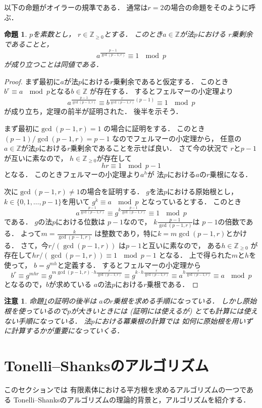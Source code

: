 \documentclass[leqno]{jsarticle}
\newtheorem{prop}[thm]{命題}
\newtheorem*{rmk}{注意}
\newcommand{\zz}{\mathbb{Z}}
\begin{document}
以下の命題がオイラーの規準である．
通常は$r=2$の場合の命題をそのように呼ぶ．
\begin{prop}\label{prop:Euler}
$p$を素数とし，
$r\in \zz_{\ge 0}$とする．
このとき$a\in \zz$が法$p$における
$r$乗剰余であることと，
\[
a^{\frac{p-1}{\gcd(p-1, r)}}\equiv 1\ \mod p
\]
が成り立つことは同値である．
\end{prop}
\begin{proof}
まず最初に$a$が法$p$における$r$乗剰余であると仮定する．
このとき$b^r\equiv a\ \mod p$となる$b\in \zz$
が存在する．
するとフェルマーの小定理より
\[
a^{\frac{p-1}{\gcd(p-1, r)}}\equiv b^{\frac{r}{\gcd(p-1,r)}(p-1)}
\equiv 1\ \mod p
\]
が成り立ち，定理の前半が証明された．
後半を示そう．

まず最初に$\gcd(p-1, r)=1$
の場合に証明をする．
このとき
$(p-1)/\gcd(p-1, r)=p-1$
なのでフェルマーの小定理から，
任意の$a\in \zz$が法$p$における$r$乗剰余であることを示せば良い．
さて今の状況で
$r$と$p-1$
が互いに素なので，
$h\in \zz_{\ge 0}$が存在して
\[
hr\equiv 1\ \mod p-1
\]
となる．
このときフェルマーの小定理より$a^{h}$が
法$p$における$a$の$r$乗根になる．

次に$\gcd(p-1, r)\neq 1$の場合を証明する．
$g$を法$p$における原始根とし，
$k\in \{0, 1, \dots, p-1\}$を用いて
$g^{k}\equiv a \ \mod p$
となっているとする．
このとき
\[
a^{\frac{p-1}{\gcd(p-1, r)}}\equiv 
g^{k\frac{p-1}{\gcd(p-1, r)}}
\equiv 1\ \mod p
\]
である．
$g$の法$p$における位数は
$p-1$なので，
$k\frac{p-1}{\gcd(p-1, r)}$は
$p-1$の倍数である．
よって$m=\frac{k}{\gcd(p-1, r)}$
は整数であり，特に$k=m\gcd(p-1, r)$とかける．
さて，今$r/(\gcd(p-1, r))$
は$p-1$と互いに素なので，
ある$h\in\zz_{\ge 0}$
が存在して$hr/(\gcd(p-1, r))\equiv 1\ \mod p-1$
となる．
上で得られた$m$と$h$を使って，
$b=g^{mh}$と定義する．
するとフェルマーの小定理から
\[
b^r\equiv g^{mhr}\equiv g^{m\gcd(p-1, r)\cdot h\frac{r}{\gcd(p-1, r)}}
\equiv g^{k\cdot h\frac{r}{\gcd(p-1, r)}}
\equiv 
a^{ h\frac{r}{\gcd(p-1, r)}}
\equiv a\ \mod p
\]
となるので，$b$が求めている
$a$の法$p$における$r$乗根である．
\end{proof}

\begin{rmk}
命題\ref{prop:Euler}の証明の後半は
$a$の$r$乗根を求める手順になっている．
しかし原始根を使っているので$p$が大きいときには
(証明には使えるが)
とても計算には使えない手順になっている．
法$p$における冪乗根の計算では
如何に原始根を用いずに計算するかが重要になっていくる．
\end{rmk}

\section{Tonelli--Shanksのアルゴリズム}
このセクションでは
有限素体における平方根を求めるアルゴリズムの一つである
Tonelli--Shanksのアルゴリズムの理論的背景と，アルゴリズムを紹介する．
\end{document}
